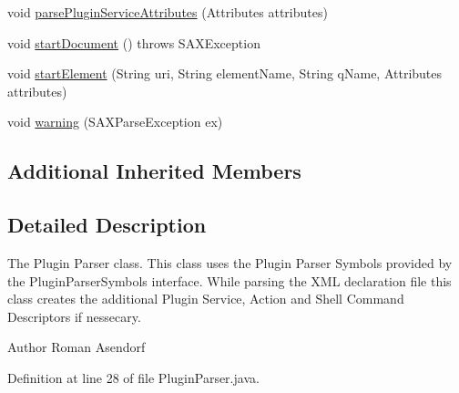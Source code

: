 \begin{DoxyCompactItemize}
\item 
void \hyperlink{classorg_1_1tzi_1_1use_1_1runtime_1_1util_1_1_plugin_parser_a191b367918f2306deb1fc007891297fd}{parse\-Plugin\-Service\-Attributes} (Attributes attributes)
\item 
void \hyperlink{classorg_1_1tzi_1_1use_1_1runtime_1_1util_1_1_plugin_parser_a8c489d8573aa5a066cbbc9a58b8aec8e}{start\-Document} ()  throws S\-A\-X\-Exception 
\item 
void \hyperlink{classorg_1_1tzi_1_1use_1_1runtime_1_1util_1_1_plugin_parser_a6eed398616428499ae997da80dc268c3}{start\-Element} (String uri, String element\-Name, String q\-Name, Attributes attributes)
\item 
void \hyperlink{classorg_1_1tzi_1_1use_1_1runtime_1_1util_1_1_plugin_parser_ac99933fd66bfb85ec4dc78ce51a8062e}{warning} (S\-A\-X\-Parse\-Exception ex)
\end{DoxyCompactItemize}
\subsection*{Additional Inherited Members}


\subsection{Detailed Description}
The Plugin Parser class. This class uses the Plugin Parser Symbols provided by the Plugin\-Parser\-Symbols interface. While parsing the X\-M\-L declaration file this class creates the additional Plugin Service, Action and Shell Command Descriptors if nessecary.

\begin{DoxyAuthor}{Author}
Roman Asendorf 
\end{DoxyAuthor}


Definition at line 28 of file Plugin\-Parser.\-java.




